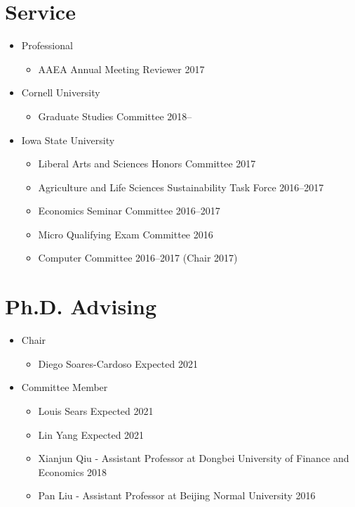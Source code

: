 \documentclass{res} %
\begin{document}
\begin{resume}
\section{Service}
\begin{itemize}
	\item[] Professional
	\vspace{-0.05in}
	\begin{itemize}
		\item[] AAEA Annual Meeting Reviewer \hfill 2017
	\end{itemize}
	\item[] Cornell University
	\vspace{-0.05in}
	\begin{itemize} \itemsep -1pt
		\item[]	Graduate Studies Committee \hfill 2018--
	\end{itemize}
	\item[] Iowa State University
	\vspace{-0.05in}
	\begin{itemize} \itemsep -1pt
		\item[]	Liberal Arts and Sciences Honors Committee \hfill 2017
		\item[] Agriculture and Life Sciences Sustainability Task Force \hfill 2016--2017
		\item[] Economics Seminar Committee \hfill 2016--2017
		\item[] Micro Qualifying Exam Committee \hfill 2016
		\item[] Computer Committee \hfill 2016--2017 (Chair 2017)
	\end{itemize}
\end{itemize}
\vspace{-.075in}


\section{Ph.D. Advising}
\begin{itemize}
	\item[] Chair
	\vspace{-0.05in}
	\begin{itemize} \itemsep -1pt
		\item[] Diego Soares-Cardoso \hfill Expected 2021
	\end{itemize}
	\vspace{-0.05in}
	\item[] Committee Member
	\vspace{-0.05in}
	\begin{itemize} \itemsep -1pt
		\item[] Louis Sears \hfill Expected 2021
		\item[] Lin Yang \hfill Expected 2021
		\item[] Xianjun Qiu - Assistant Professor at Dongbei University of Finance and Economics \hfill 2018
		\item[] Pan Liu - Assistant Professor at Beijing Normal University \hfill 2016
	\end{itemize}
\end{itemize}
\vspace{-.075in}


\end{resume}
\end{document}
